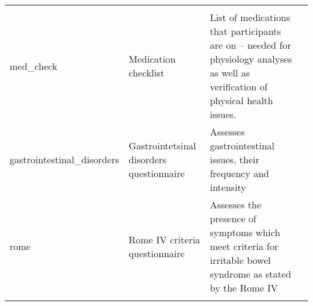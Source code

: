 \documentclass[]{book}
\begin{document}
\begin{longtable}[]{@{}llll@{}}
\begin{minipage}[t]{0.22\columnwidth}
\end{minipage} & \begin{minipage}[t]{0.18\columnwidth}\raggedright
\strut
\end{minipage}\tabularnewline
\begin{minipage}[t]{0.22\columnwidth}\raggedright
med\_check\strut
\end{minipage} & \begin{minipage}[t]{0.27\columnwidth}\raggedright
Medication checklist\strut
\end{minipage} & \begin{minipage}[t]{0.22\columnwidth}\raggedright
List of medications that participants are on -- needed for physiology analyses as well as verification of physical health issues.\strut
\end{minipage} & \begin{minipage}[t]{0.18\columnwidth}\raggedright
\strut
\end{minipage}\tabularnewline
\begin{minipage}[t]{0.22\columnwidth}\raggedright
gastrointestinal\_disorders\strut
\end{minipage} & \begin{minipage}[t]{0.27\columnwidth}\raggedright
Gastrointetsinal disorders questionnaire\strut
\end{minipage} & \begin{minipage}[t]{0.22\columnwidth}\raggedright
Assesses gastrointestinal issues, their frequency and intensity\strut
\end{minipage} & \begin{minipage}[t]{0.18\columnwidth}\raggedright
\strut
\end{minipage}\tabularnewline
\begin{minipage}[t]{0.22\columnwidth}\raggedright
rome\strut
\end{minipage} & \begin{minipage}[t]{0.27\columnwidth}\raggedright
Rome IV criteria questionnaire\strut
\end{minipage} & \begin{minipage}[t]{0.22\columnwidth}\raggedright
Assesses the presence of symptoms which meet criteria for irritable bowel syndrome as stated by the Rome IV\strut
\end{minipage} & \begin{minipage}[t]{0.18\columnwidth}\raggedright
\strut
\end{minipage}\tabularnewline
\begin{minipage}[t]{0.22\columnwidth}\raggedright

\end{minipage}
\end{longtable}
\end{document}
